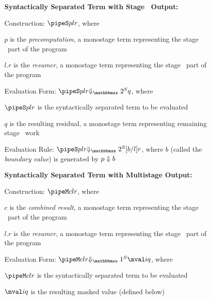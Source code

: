 \begin{figure*}
\begin{abstrsyn}

\textbf{Syntactically Separated Term with Stage \bbtwo\ Output:}

\hspace{2em} Construction: $\pipeS p l r$, where 
	
	\hspace{4em} $p$ is the {\em precomputation}, a monostage term representing the stage \bbone\ part of the program
	
	\hspace{4em} $l.r$ is the {\em resumer}, a monostage term representing the stage \bbtwo\ part of the program

\hspace{2em} Evaluation Form: $\sepredtwo {\pipeS p l r} q$, where 
	
	\hspace{4em} $\pipeS p l r$ is the syntactically separated term to be evaluated 
	
	\hspace{4em} $q$ is the resulting residual, a monostage term representing remaining stage \bbtwo\ work

\hspace{2em} Evaluation Rule: $\sepredtwo {\pipeS p l r} {[b/l]r}$, where $b$ (called the {\em boundary value}) is generated by ${p} \Downarrow {b}$

\textbf{Syntactically Separated Term with Multistage Output:}

\hspace{2em} Construction: $\pipeM c l r$, where 
	
	\hspace{4em} $c$ is the {\em combined result}, a monostage term representing the stage \bbone\ part of the program
	
	\hspace{4em} $l.r$ is the {\em resumer}, a monostage term representing the stage \bbtwo\ part of the program

\hspace{2em} Evaluation Form: $\sepredone {\pipeM c l r} {\mval i q}$, where 
	
	\hspace{4em} $\pipeM c l r$ is the syntactically separated term to be evaluated
	
	\hspace{4em} $\mval i q$ is the resulting masked value (defined below)


\end{abstrsyn}
\end{figure*}

